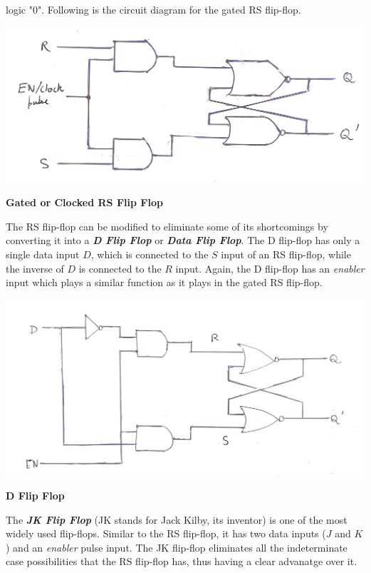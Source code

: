 logic "0". Following is the circuit diagram for the gated RS flip-flop.
\begin{center}
    \includegraphics[scale = 0.16]{Documents/clockedrsff_1.jpg}
\end{center}
\begin{center}
    \textbf{Gated or Clocked RS Flip Flop}
\end{center}
The RS flip-flop can be modified to eliminate some of its shortcomings by converting it into a \textbf{\emph{D Flip Flop}} or \textbf{\emph{Data Flip Flop}}. The D flip-flop has only a single data input $D$, which is connected to the $S$ input of an RS 
flip-flop, while the inverse of $D$ is connected to the $R$ input. Again, the D flip-flop has an \emph{enabler} input which plays a similar function as it plays in the gated RS flip-flop.
\begin{center}
    \includegraphics[scale = 0.18]{Documents/dff_1.jpg}
\end{center}
\begin{center}
    \textbf{D Flip Flop}
\end{center}
The \textbf{\emph{JK Flip Flop}} (JK stands for Jack Kilby, its inventor) is one of the most widely used flip-flops. Similar to the RS flip-flop, it has two data inputs ($J$ and $K$) and an \emph{enabler} pulse input. The JK flip-flop eliminates all the indeterminate case possibilities that the RS flip-flop has, thus having a clear advanatge over it.
